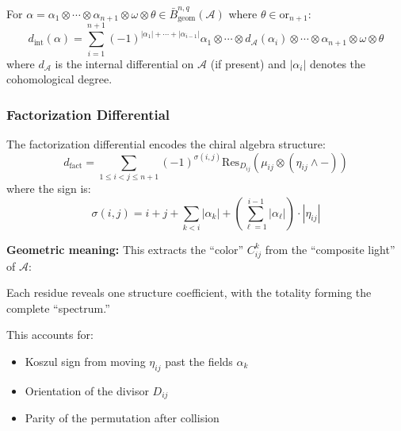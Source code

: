 \begin{definition}
For $\alpha = \alpha_1 \otimes \cdots \otimes \alpha_{n+1} \otimes \omega \otimes \theta \in 
\bar{B}^{n,q}_{\text{geom}}(\mathcal{A})$ where $\theta \in \text{or}_{n+1}$:
\[
d_{\text{int}}(\alpha) = \sum_{i=1}^{n+1} (-1)^{|\alpha_1| + \cdots + |\alpha_{i-1}|} 
\alpha_1 \otimes \cdots \otimes d_{\mathcal{A}}(\alpha_i) \otimes \cdots \otimes \alpha_{n+1} \otimes \omega \otimes \theta
\]
where $d_{\mathcal{A}}$ is the internal differential on $\mathcal{A}$ (if present) and $|\alpha_i|$ denotes 
the cohomological degree.
\end{definition}
 
\subsubsection{Factorization Differential}
 
\begin{definition}\label{def:diff-fact}
   The factorization differential encodes the chiral algebra structure:
   \[
   d_{\text{fact}} = \sum_{1 \leq i < j \leq n+1} (-1)^{\sigma(i,j)} \text{Res}_{D_{ij}} \left(\mu_{ij} \otimes (\eta_{ij} \wedge -)\right)
   \]
   where the sign is:
   $$\sigma(i,j) = i + j + \sum_{k<i} |\alpha_k| + \left(\sum_{\ell=1}^{i-1} |\alpha_\ell|\right) \cdot |\eta_{ij}|$$
   
   \textbf{Geometric meaning:} This extracts the ``color'' $C_{ij}^k$ from the ``composite light'' of $\mathcal{A}$:
   \begin{center}
   \end{center}
   
   Each residue reveals one structure coefficient, with the totality forming the complete ``spectrum.''
   
   This accounts for:
   \begin{itemize}
   \item Koszul sign from moving $\eta_{ij}$ past the fields $\alpha_k$
   \item Orientation of the divisor $D_{ij}$  
   \item Parity of the permutation after collision
   \end{itemize}
   \end{definition}
   
